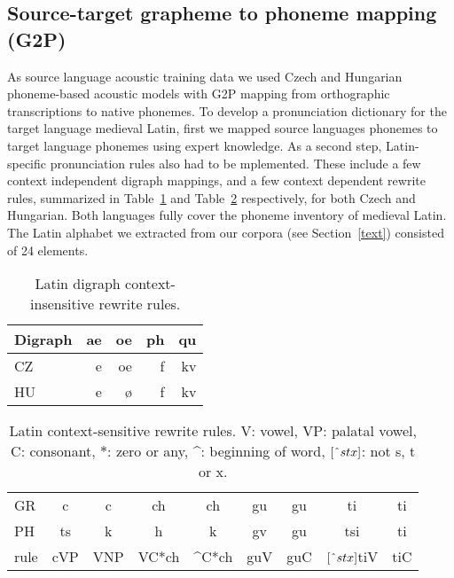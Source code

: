 \documentclass[runningheads,a4paper]{llncs}
\begin{document}
\subsection{Source-target grapheme to phoneme mapping (G2P)}\label{g2p}
As source language acoustic training data we used Czech and Hungarian phoneme-based acoustic models with G2P mapping from orthographic transcriptions to native phonemes.
To develop a pronunciation dictionary for the target language medieval Latin, first we mapped source languages phonemes to target language phonemes using expert knowledge.
As a second step, Latin-specific pronunciation rules also had to be mplemented.
These include a few context independent digraph mappings, and a few context dependent rewrite rules, summarized in Table~\ref{tbl:digraph} and Table~\ref{tbl:context} respectively, for both Czech and Hungarian.
Both languages fully cover the phoneme inventory of medieval Latin.
The Latin alphabet we extracted from our corpora (see Section~\ref{text}) consisted of 24 elements.

\begin{table}
	\centering
	\caption{Latin digraph context-insensitive rewrite rules.}\label{tbl:digraph}
	\begin{tabular}{l|rrrr}
	\hline
	Digraph & ae & oe & ph & qu \\
	\hline
	CZ & e & oe & f & kv \\
	HU & e & \o & f & kv \\
	\hline
	\end{tabular}
\end{table}

\begin{table}
	\centering
	\caption{Latin context-sensitive rewrite rules. V: vowel, VP: palatal vowel, C: consonant, $*$: zero or any, \string^: beginning of word, $[\string^stx]$: not s, t or x.}\label{tbl:context}
	\begin{tabular}{l|cc|cc|cc|cc}
	\hline
	GR & c & c & ch & ch & gu & gu & ti & ti \\
	PH & ts & k & h & k & gv & gu & tsi & ti \\
	\hline
	rule & \multicolumn{1}{c|}{cVP} & \multicolumn{1}{c|}{VNP} & \multicolumn{1}{c|}{VC*ch} & \multicolumn{1}{c|}{\string^C*ch} & \multicolumn{1}{c|}{guV} & \multicolumn{1}{c|}{guC} & \multicolumn{1}{c|}{$[\string^stx]$tiV} & \multicolumn{1}{c|}{tiC} \\
	\hline
	\end{tabular}
\end{table}
\end{document}

